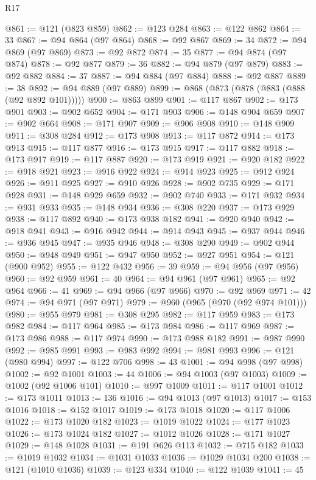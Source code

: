\begin{lexlean}{R17}
\begin{coremodule}
@861 := @121 (@823 @859)
@862 := @123 @284
@863 := @122 @862
@864 := 33
@867 := @94 @864 (@97 @864)
@868 := @92 @867
@869 := 34
@872 := @94 @869 (@97 @869)
@873 := @92 @872
@874 := 35
@877 := @94 @874 (@97 @874)
@878 := @92 @877
@879 := 36
@882 := @94 @879 (@97 @879)
@883 := @92 @882
@884 := 37
@887 := @94 @884 (@97 @884)
@888 := @92 @887
@889 := 38
@892 := @94 @889 (@97 @889)
@899 := @868 (@873 (@878 (@883 (@888 (@92 @892 @101)))))
@900 := @863 @899
@901 := @117 @867
@902 := @173 @901
@903 := @902 @652
@904 := @171 @903
@906 := @148 @904 @659
@907 := @902 @664
@908 := @171 @907
@909 := @906 @908
@910 := @148 @909
@911 := @308 @284
@912 := @173 @908
@913 := @117 @872
@914 := @173 @913
@915 := @117 @877
@916 := @173 @915
@917 := @117 @882
@918 := @173 @917
@919 := @117 @887
@920 := @173 @919
@921 := @920 @182
@922 := @918 @921
@923 := @916 @922
@924 := @914 @923
@925 := @912 @924
@926 := @911 @925
@927 := @910 @926
@928 := @902 @735
@929 := @171 @928
@931 := @148 @929 @659
@932 := @902 @740
@933 := @171 @932
@934 := @931 @933
@935 := @148 @934
@936 := @308 @220
@937 := @173 @929
@938 := @117 @892
@940 := @173 @938 @182
@941 := @920 @940
@942 := @918 @941
@943 := @916 @942
@944 := @914 @943
@945 := @937 @944
@946 := @936 @945
@947 := @935 @946
@948 := @308 @290
@949 := @902 @944
@950 := @948 @949
@951 := @947 @950
@952 := @927 @951
@954 := @121 (@900 @952)
@955 := @122 @432
@956 := 39
@959 := @94 @956 (@97 @956)
@960 := @92 @959
@961 := 40
@964 := @94 @961 (@97 @961)
@965 := @92 @964
@966 := 41
@969 := @94 @966 (@97 @966)
@970 := @92 @969
@971 := 42
@974 := @94 @971 (@97 @971)
@979 := @960 (@965 (@970 (@92 @974 @101)))
@980 := @955 @979
@981 := @308 @295
@982 := @117 @959
@983 := @173 @982
@984 := @117 @964
@985 := @173 @984
@986 := @117 @969
@987 := @173 @986
@988 := @117 @974
@990 := @173 @988 @182
@991 := @987 @990
@992 := @985 @991
@993 := @983 @992
@994 := @981 @993
@996 := @121 (@980 @994)
@997 := @122 @706
@998 := 43
@1001 := @94 @998 (@97 @998)
@1002 := @92 @1001
@1003 := 44
@1006 := @94 @1003 (@97 @1003)
@1009 := @1002 (@92 @1006 @101)
@1010 := @997 @1009
@1011 := @117 @1001
@1012 := @173 @1011
@1013 := 136
@1016 := @94 @1013 (@97 @1013)
@1017 := @153 @1016
@1018 := @152 @1017
@1019 := @173 @1018
@1020 := @117 @1006
@1022 := @173 @1020 @182
@1023 := @1019 @1022
@1024 := @177 @1023
@1026 := @173 @1024 @182
@1027 := @1012 @1026
@1028 := @171 @1027
@1029 := @148 @1028
@1031 := @191 @626 @113
@1032 := @715 @182
@1033 := @1019 @1032
@1034 := @1031 @1033
@1036 := @1029 @1034 @200
@1038 := @121 (@1010 @1036)
@1039 := @123 @334
@1040 := @122 @1039
@1041 := 45

\end{coremodule}
\end{lexlean}
